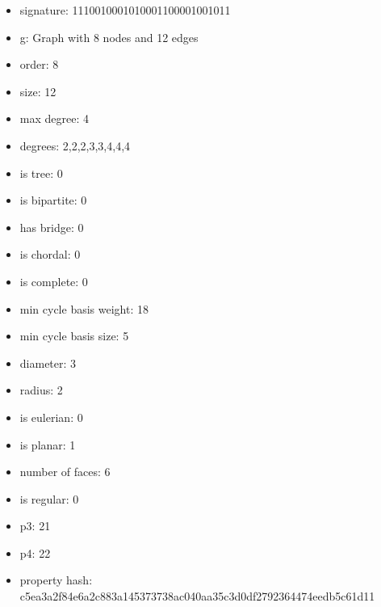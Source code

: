 \begin{itemize}
\item signature: 1110010001010001100001001011
\item g: Graph with 8 nodes and 12 edges
\item order: 8
\item size: 12
\item max degree: 4
\item degrees: 2,2,2,3,3,4,4,4
\item is tree: 0
\item is bipartite: 0
\item has bridge: 0
\item is chordal: 0
\item is complete: 0
\item min cycle basis weight: 18
\item min cycle basis size: 5
\item diameter: 3
\item radius: 2
\item is eulerian: 0
\item is planar: 1
\item number of faces: 6
\item is regular: 0
\item p3: 21
\item p4: 22
\item property hash: c5ea3a2f84e6a2c883a145373738ac040aa35c3d0df2792364474eedb5c61d11
\end{itemize}
\newpage
\begin{figure}
\end{figure}
